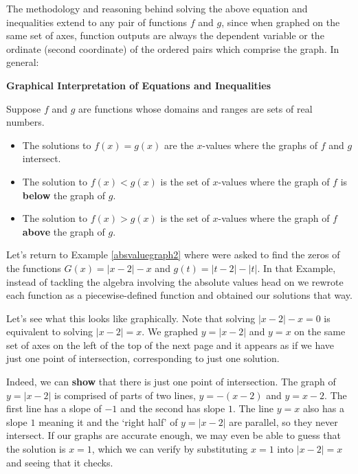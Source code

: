 \documentclass{ximera}
\begin{document}
\medskip

The methodology and reasoning behind solving the above equation and inequalities extend to any pair of functions $f$ and $g$, since when graphed on the same set of axes, function outputs are always the dependent variable or the ordinate (second coordinate) of the ordered pairs which comprise the graph.  In general:

\medskip

\colorbox{ResultColor}{\bbm

\centerline{\textbf{Graphical Interpretation of Equations and Inequalities}}

\medskip

Suppose $f$ and $g$ are functions whose domains and ranges are sets of real numbers.

\begin{itemize}

\item  The solutions to $f(x)=g(x)$ are the $x$-values where the graphs of $f$ and $g$ intersect.

\item  The solution to $f(x) < g(x)$ is the set of $x$-values where the graph of $f$ is \textbf{below} the graph of $g$.

\item  The solution to $f(x) > g(x)$ is the set of $x$-values where the graph of $f$ \textbf{above} the graph of $g$.

\end{itemize}

\ebm}

\medskip

Let's return to  Example \ref{absvaluegraph2} where were asked to find the zeros of the functions $G(x) = |x-2| -x$ and $g(t) = |t-2|-|t|$. In that Example, instead of tackling the algebra involving the absolute values head on we rewrote each function as a piecewise-defined function and obtained our solutions that way.  

\medskip

Let's see what this looks like graphically.  Note that solving $|x-2|-x=0$ is equivalent to solving $|x-2|=x$.  We graphed $y = |x-2|$ and $y=x$ on the same set of axes on the left of the top of the next page and it appears as if we have just one point of intersection, corresponding to just one solution. 

\medskip

Indeed, we can \textbf{show} that there is just one point of intersection.  The graph of  $y = |x-2|$ is comprised of parts of two lines, $y =-(x-2)$ and $y = x-2$. The first line has a slope of $-1$ and the second has slope $1$.  The line $y = x$ also has a slope $1$ meaning it and the `right half' of $y =|x-2|$  are parallel, so they never intersect.  If our graphs are accurate enough, we may even be able to guess that the solution is $x = 1$, which we can verify by  substituting $x = 1$ into $|x-2| = x$ and seeing that it checks.  
\end{document}

